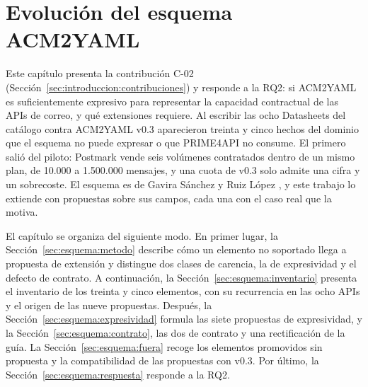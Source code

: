 \chapter[Evolución del esquema ACM2YAML]{Evolución del esquema\\ ACM2YAML}
\label{cap:evolucion}

Este capítulo presenta la contribución C-02 (Sección~\ref{sec:introduccion:contribuciones}) y responde a la RQ2: si ACM2YAML es suficientemente expresivo para representar la capacidad contractual de las APIs de correo, y qué extensiones requiere.
Al escribir las ocho Datasheets del catálogo contra ACM2YAML v0.3 aparecieron treinta y cinco hechos del dominio que el esquema no puede expresar o que PRIME4API no consume.
El primero salió del piloto: Postmark vende seis volúmenes contratados dentro de un mismo plan, de 10.000 a 1.500.000 mensajes, y una cuota de v0.3 solo admite una cifra y un sobrecoste.
El esquema es de Gavira Sánchez y Ruiz López \citep{gavira2026tfm,ruizlopez2026tfm}, y este trabajo lo extiende con propuestas sobre sus campos, cada una con el caso real que la motiva.

El capítulo se organiza del siguiente modo.
En primer lugar, la Sección~\ref{sec:esquema:metodo} describe cómo un elemento no soportado llega a propuesta de extensión y distingue dos clases de carencia, la de expresividad y el defecto de contrato.
A continuación, la Sección~\ref{sec:esquema:inventario} presenta el inventario de los treinta y cinco elementos, con su recurrencia en las ocho APIs y el origen de las nueve propuestas.
Después, la Sección~\ref{sec:esquema:expresividad} formula las siete propuestas de expresividad, y la Sección~\ref{sec:esquema:contrato}, las dos de contrato y una rectificación de la guía.
La Sección~\ref{sec:esquema:fuera} recoge los elementos promovidos sin propuesta y la compatibilidad de las propuestas con v0.3.
Por último, la Sección~\ref{sec:esquema:respuesta} responde a la RQ2.







